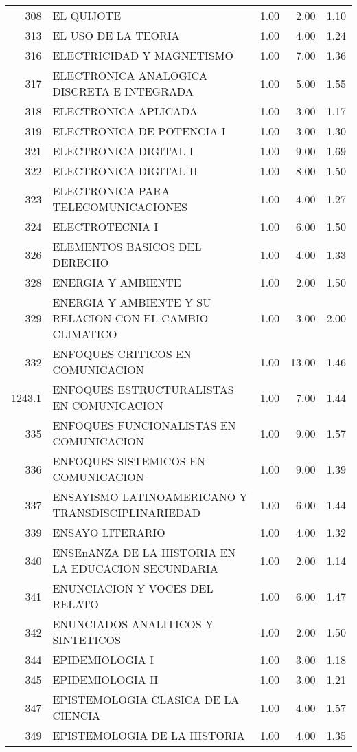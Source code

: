 \begin{table}[ht]
\begin{tabular}{rlrrr}
  308 & EL QUIJOTE & 1.00 & 2.00 & 1.10 \\ 
  313 & EL USO DE LA TEORIA & 1.00 & 4.00 & 1.24 \\ 
  316 & ELECTRICIDAD Y MAGNETISMO & 1.00 & 7.00 & 1.36 \\ 
  317 & ELECTRONICA ANALOGICA DISCRETA E INTEGRADA & 1.00 & 5.00 & 1.55 \\ 
  318 & ELECTRONICA APLICADA & 1.00 & 3.00 & 1.17 \\ 
  319 & ELECTRONICA DE POTENCIA I & 1.00 & 3.00 & 1.30 \\ 
  321 & ELECTRONICA DIGITAL I & 1.00 & 9.00 & 1.69 \\ 
  322 & ELECTRONICA DIGITAL II & 1.00 & 8.00 & 1.50 \\ 
  323 & ELECTRONICA PARA TELECOMUNICACIONES & 1.00 & 4.00 & 1.27 \\ 
  324 & ELECTROTECNIA I & 1.00 & 6.00 & 1.50 \\ 
  326 & ELEMENTOS BASICOS DEL DERECHO & 1.00 & 4.00 & 1.33 \\ 
  328 & ENERGIA Y AMBIENTE & 1.00 & 2.00 & 1.50 \\ 
  329 & ENERGIA Y AMBIENTE Y SU RELACION CON EL CAMBIO CLIMATICO & 1.00 & 3.00 & 2.00 \\ 
  332 & ENFOQUES CRITICOS EN COMUNICACION & 1.00 & 13.00 & 1.46 \\ 
  1243.1 & ENFOQUES ESTRUCTURALISTAS EN COMUNICACION & 1.00 & 7.00 & 1.44 \\ 
  335 & ENFOQUES FUNCIONALISTAS EN COMUNICACION & 1.00 & 9.00 & 1.57 \\ 
  336 & ENFOQUES SISTEMICOS EN COMUNICACION & 1.00 & 9.00 & 1.39 \\ 
  337 & ENSAYISMO LATINOAMERICANO Y TRANSDISCIPLINARIEDAD & 1.00 & 6.00 & 1.44 \\ 
  339 & ENSAYO LITERARIO & 1.00 & 4.00 & 1.32 \\ 
  340 & ENSEnANZA DE LA HISTORIA EN LA EDUCACION SECUNDARIA & 1.00 & 2.00 & 1.14 \\ 
  341 & ENUNCIACION Y VOCES DEL RELATO & 1.00 & 6.00 & 1.47 \\ 
  342 & ENUNCIADOS ANALITICOS Y SINTETICOS & 1.00 & 2.00 & 1.50 \\ 
  344 & EPIDEMIOLOGIA I & 1.00 & 3.00 & 1.18 \\ 
  345 & EPIDEMIOLOGIA II & 1.00 & 3.00 & 1.21 \\ 
  347 & EPISTEMOLOGIA CLASICA DE LA CIENCIA & 1.00 & 4.00 & 1.57 \\ 
  349 & EPISTEMOLOGIA DE LA HISTORIA & 1.00 & 4.00 & 1.35 \\ 

\end{tabular}
\end{table}
